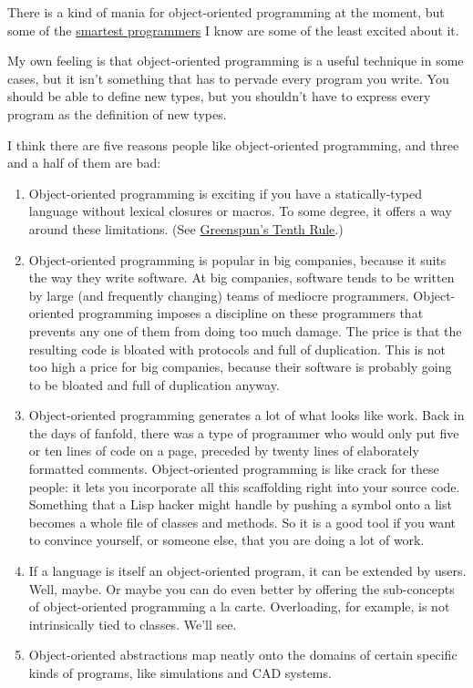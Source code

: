 \documentclass[12pt]{book}
\begin{document}
There is a kind of mania for object-oriented programming at the moment,
but some of the \href{reesoo.html}{smartest programmers} I know are some
of the least excited about it.

My own feeling is that object-oriented programming is a useful technique
in some cases, but it isn't something that has to pervade every program
you write. You should be able to define new types, but you shouldn't
have to express every program as the definition of new types.

I think there are five reasons people like object-oriented programming,
and three and a half of them are bad:

\begin{enumerate}
\def\labelenumi{\arabic{enumi}.}
\item
  Object-oriented programming is exciting if you have a statically-typed
  language without lexical closures or macros. To some degree, it offers
  a way around these limitations. (See \href{quotes.html}{Greenspun's
  Tenth Rule}.)
\item
  Object-oriented programming is popular in big companies, because it
  suits the way they write software. At big companies, software tends to
  be written by large (and frequently changing) teams of mediocre
  programmers. Object-oriented programming imposes a discipline on these
  programmers that prevents any one of them from doing too much damage.
  The price is that the resulting code is bloated with protocols and
  full of duplication. This is not too high a price for big companies,
  because their software is probably going to be bloated and full of
  duplication anyway.
\item
  Object-oriented programming generates a lot of what looks like work.
  Back in the days of fanfold, there was a type of programmer who would
  only put five or ten lines of code on a page, preceded by twenty lines
  of elaborately formatted comments. Object-oriented programming is like
  crack for these people: it lets you incorporate all this scaffolding
  right into your source code. Something that a Lisp hacker might handle
  by pushing a symbol onto a list becomes a whole file of classes and
  methods. So it is a good tool if you want to convince yourself, or
  someone else, that you are doing a lot of work.
\item
  If a language is itself an object-oriented program, it can be extended
  by users. Well, maybe. Or maybe you can do even better by offering the
  sub-concepts of object-oriented programming a la carte. Overloading,
  for example, is not intrinsically tied to classes. We'll see.
\item
  Object-oriented abstractions map neatly onto the domains of certain
  specific kinds of programs, like simulations and CAD systems.
\end{enumerate}
\end{document}
